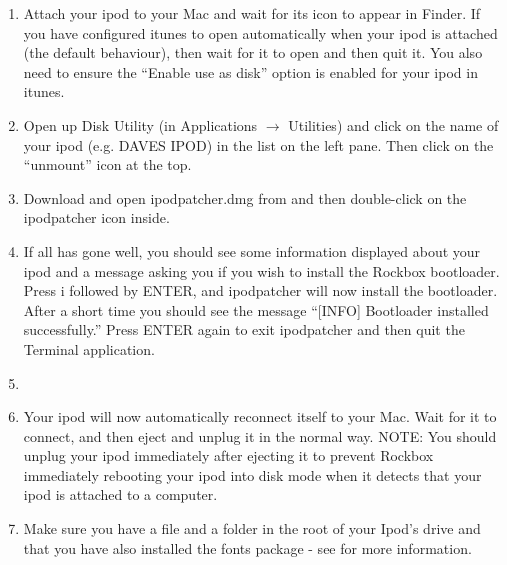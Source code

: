 \begin{enumerate}

\item Attach your ipod to your Mac and wait for its icon to appear in 
Finder. If you have configured itunes to open automatically when your
ipod is attached (the default behaviour), then wait for it to open and
then quit it. You also need to ensure the ``Enable use as disk'' option
is enabled for your ipod in itunes.

\item Open up Disk Utility (in Applications $\rightarrow$ Utilities) and click 
on the name of your ipod (e.g. DAVES IPOD) in the list on the left 
pane. Then click on the ``unmount'' icon at the top. 

\item Download and open ipodpatcher.dmg from 
and then double-click on the ipodpatcher icon inside. 

\item If all has gone well, you should see some 
information displayed about your ipod and a message asking you if you 
wish to install the Rockbox bootloader. Press i followed by ENTER, and 
ipodpatcher will now install the bootloader. After a short time you 
should see the message ``[INFO] Bootloader installed successfully.'' Press 
ENTER again to exit ipodpatcher and then quit the Terminal application.

\item {}

\item Your ipod will now automatically reconnect itself to your Mac. 
Wait for it to connect, and then eject and unplug it in the normal way. 
NOTE: You should unplug your ipod immediately after ejecting it to 
prevent Rockbox immediately rebooting your ipod into disk mode when it 
detects that your ipod is attached to a computer. 

\item Make sure you have a  file and a 
 folder in the 
root of your Ipod's drive and that you have also installed the fonts
package - see  for more information.

\end{enumerate}

